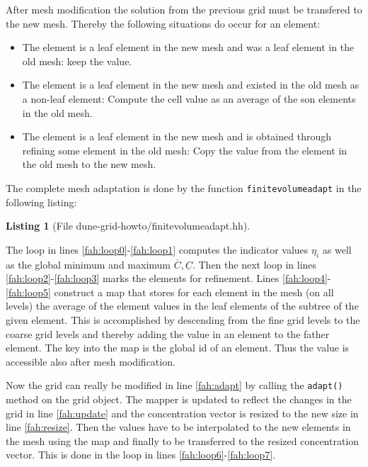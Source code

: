 \documentclass[11pt,a4paper,headinclude,footinclude,DIV16,normalheadings]{scrreprt}
\newtheorem{lst}{Listing}
\begin{document}
After mesh modification the solution from the previous grid must be
transfered to the new mesh. Thereby the following situations do occur
for an element:
\begin{itemize}
\item The element is a leaf element in the new mesh and was a leaf
  element in the old mesh: keep the value.
\item The element is a leaf element in the new mesh and existed in the
  old mesh as a non-leaf element: Compute the cell value as an average
  of the son elements in the old mesh.
\item The element is a leaf element in the new mesh and is obtained
  through refining some element in the old mesh: Copy the value
  from the element in the old mesh to the new mesh.
\end{itemize}

The complete mesh adaptation is done by the function
\lstinline!finitevolumeadapt! in the following listing:

\begin{lst}[File dune-grid-howto/finitevolumeadapt.hh] \mbox{}
\nopagebreak

\end{lst}

The loop in lines \ref{fah:loop0}-\ref{fah:loop1} computes the
indicator values $\eta_i$ as well as the global minimum and maximum
$\overline{C},\underline{C}$. Then the next loop in lines
\ref{fah:loop2}-\ref{fah:loop3} marks the elements for refinement.
Lines \ref{fah:loop4}-\ref{fah:loop5} construct a map that stores for
each element in the mesh (on all levels) the average of the element
values in the leaf elements of the subtree of the given element. This
is accomplished by descending from the fine grid levels to the coarse
grid levels and thereby adding the value in an element to the father
element. The key into the map is the global id of an element. Thus the
value is accessible also after mesh modification.

Now the grid can really be modified in line \ref{fah:adapt} by calling the
\lstinline!adapt()! method on the grid object. The mapper is updated
to reflect the changes in the grid in line \ref{fah:update} and the
concentration vector is resized to the new size in line
\ref{fah:resize}. Then the values have to be interpolated to the new
elements in the mesh using the map and finally to be transferred to
the resized concentration vector. This is done in the loop in lines
\ref{fah:loop6}-\ref{fah:loop7}.
\end{document}
